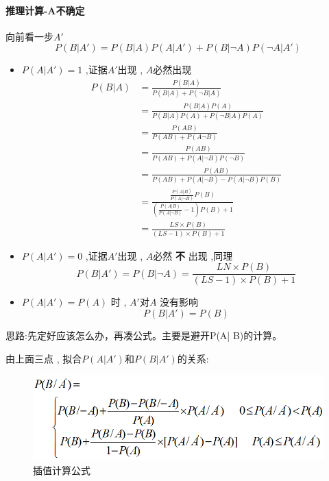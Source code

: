 \documentclass[UTF8,a4paper]{ctexart}
\begin{document}
\paragraph{推理计算-A不确定} 向前看一步$A'$
\[P(B|A') = P(B|A)P(A|A') + P(B|\lnot A)P(\lnot A|A')\]
\begin{itemize}
	\item $P(A|A') = 1$ ,证据$A'$出现 , $A$必然出现
	      \begin{equation}
		      \begin{array}{ll}
			      P(B|A) & = \displaystyle\frac{P(B|A)}{P(B|A) + P(\lnot B|A)}                                         \\
			             & = \displaystyle\frac{P(B|A)P(A)}{P(B|A)P(A) + P(\lnot B|A)P(A)}                             \\
			             & = \displaystyle\frac{P(AB)}{P(AB) + P(A\lnot B)}                                            \\
			             & = \displaystyle\frac{P(AB)}{P(AB) + P(A|\lnot B)P(\lnot B)}                                      \\
			             & = \displaystyle\frac{P(AB)}{P(AB) + P(A|\lnot B)-P(A|\lnot B)P(B)}                               \\
			             & = \displaystyle\frac{\frac{P(A|B)}{P(A|\lnot B)}P(B)}{(\frac{P(A|B)}{P(A|\lnot B)} - 1)P(B) + 1} \\
			             & = \displaystyle\frac{LS \times P(B)}{(LS - 1)\times P(B) + 1}
		      \end{array}
	      \end{equation}
	\item  $P(A|A') = 0$ ,证据$A'$出现 , $A$必然 \textbf{不} 出现 ,同理
	      \[P(B|A') = P(B|\lnot A) = \frac{LN \times P(B)}{(LS - 1)\times P(B) + 1}\]
	\item $P(A|A') = P(A)$ 时 , $A'$对$A$ 没有影响 \\
	      \[P(B|A') = P(B)\]
\end{itemize}

思路:先定好应该怎么办，再凑公式。主要是避开P(A| B)的计算。

由上面三点 , 拟合$P(A|A')$和$P(B|A')$的关系:
\begin{figure}[H]
	\centering
	\includegraphics[scale = 0.3]{assets/ArtificialIntelligence/2018-01-09-00-11-12.png}
	\caption{插值计算公式}
\end{figure}
\end{document}
